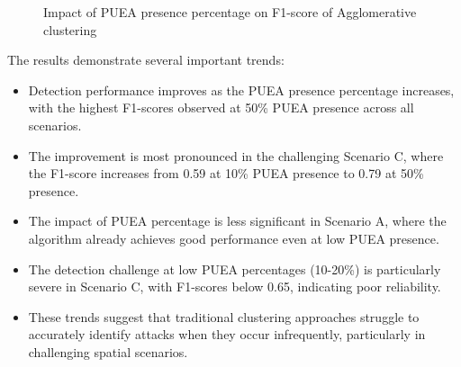 \begin{figure}[htbp]
    \centering
    \caption{Impact of PUEA presence percentage on F1-score of Agglomerative clustering}
    \label{fig:puea_percentage_impact}
\end{figure}

The results demonstrate several important trends:

\begin{itemize}
    \item Detection performance improves as the PUEA presence percentage increases, with the highest F1-scores observed at 50\% PUEA presence across all scenarios.
    
    \item The improvement is most pronounced in the challenging Scenario C, where the F1-score increases from 0.59 at 10\% PUEA presence to 0.79 at 50\% presence.
    
    \item The impact of PUEA percentage is less significant in Scenario A, where the algorithm already achieves good performance even at low PUEA presence.
    
    \item The detection challenge at low PUEA percentages (10-20\%) is particularly severe in Scenario C, with F1-scores below 0.65, indicating poor reliability.
    
    \item These trends suggest that traditional clustering approaches struggle to accurately identify attacks when they occur infrequently, particularly in challenging spatial scenarios.
\end{itemize}

